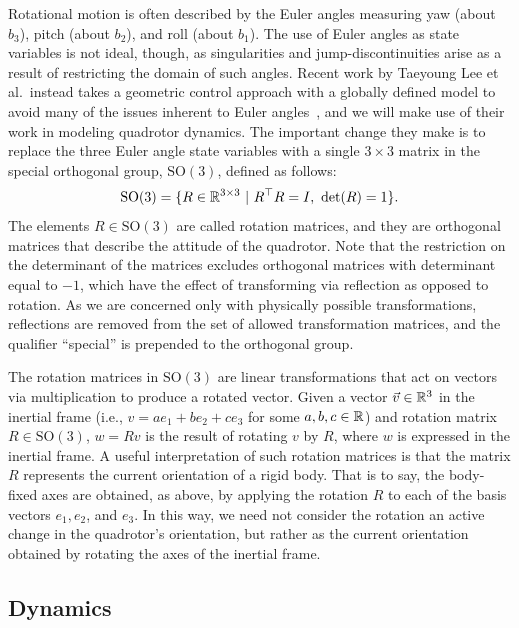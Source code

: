 Rotational motion is often described by the Euler angles measuring yaw (about $b_3$), pitch (about $b_2$), and roll (about $b_1$). The use of Euler angles as state variables is not ideal, though, as singularities and jump-discontinuities arise as a result of restricting the domain of such angles. Recent work by Taeyoung Lee et al.\ instead takes a geometric control approach with a globally defined model to avoid many of the issues inherent to Euler angles~\cite{Lee2010}, and we will make use of their work in modeling quadrotor dynamics. The important change they make is to replace the three Euler angle state variables with a single $3 \times 3$ matrix in the special orthogonal group, $\text{SO}(3)$, defined as follows:
\begin{equation}
    \text{SO}(3) = \{ R \in \mathbb{R}^{3 \times 3} \ \vert \ R^\top R = I,\ \det(R) = 1 \}.
\end{equation}
The elements $R \in \text{SO}(3)$ are called rotation matrices, and they are orthogonal matrices that describe the attitude of the quadrotor. Note that the restriction on the determinant of the matrices excludes orthogonal matrices with determinant equal to $-1$, which have the effect of transforming via reflection as opposed to rotation. As we are concerned only with physically possible transformations, reflections are removed from the set of allowed transformation matrices, and the qualifier ``special'' is prepended to the orthogonal group. 

The rotation matrices in $\text{SO}(3)$ are linear transformations that act on vectors via multiplication to produce a rotated vector. Given a vector $\vec{v} \in \mathbb{R}^3$ in the inertial frame (i.e., $v = ae_1 + be_2 + ce_3$ for some $a,b,c \in \mathbb{R}$) and rotation matrix $R \in \text{SO}(3)$, $w=Rv$ is the result of rotating $v$ by $R$, where $w$ is expressed in the inertial frame. A useful interpretation of such rotation matrices is that the matrix $R$ represents the current orientation of a rigid body. That is to say, the body-fixed axes are obtained, as above, by applying the rotation $R$ to each of the basis vectors $e_1, e_2$, and $e_3$. In this way, we need not consider the rotation an active change in the quadrotor's orientation, but rather as the current orientation obtained by rotating the axes of the inertial frame.





\subsection{Dynamics}\label{quad:dynamics}

